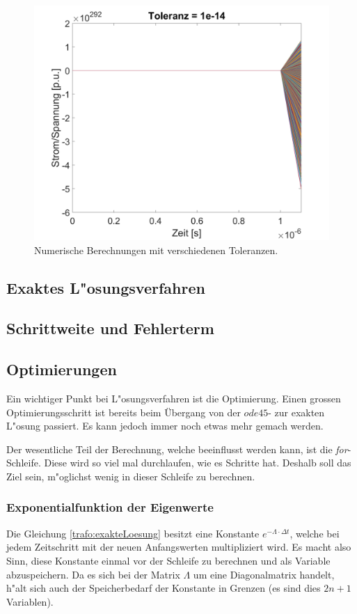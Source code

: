 \begin{refsection}
\begin{figure}
\begin{minipage}{.5\textwidth}
	    \end{minipage}%
	    \begin{minipage}{.5\textwidth}
	        \centering
	        \includegraphics[width=0.7\linewidth]{./trafo/images/svd14.png}
	    \end{minipage}
	    \caption{Numerische Berechnungen mit verschiedenen Toleranzen. }
	    \label{trafo:SVDTol}
	\end{figure}

\subsection{Exaktes L"osungsverfahren}

\subsection{Schrittweite und Fehlerterm}

\subsection{Optimierungen}

Ein wichtiger Punkt bei L"osungsverfahren ist die Optimierung. Einen grossen Optimierungsschritt ist bereits beim Übergang von der $ode45$- zur exakten L"osung passiert. Es kann jedoch immer noch etwas mehr gemach werden. 

Der wesentliche Teil der Berechnung, welche beeinflusst werden kann, ist die \textit{for}-Schleife. Diese wird so viel mal durchlaufen, wie es Schritte hat. Deshalb soll das Ziel sein, m"oglichst wenig in dieser Schleife zu berechnen. 

\subsubsection{Exponentialfunktion der Eigenwerte}
Die Gleichung \ref{trafo:exakteLoesung} besitzt eine Konstante $e^{-\Lambda \cdot \Delta t}$, welche bei jedem Zeitschritt mit der neuen Anfangswerten multipliziert wird. Es macht also Sinn, diese Konstante einmal vor der Schleife zu berechnen und als Variable abzuspeichern. Da es sich bei der Matrix $\Lambda$ um eine Diagonalmatrix handelt, h"alt sich auch der Speicherbedarf der Konstante in Grenzen (es sind dies $2n + 1$ Variablen). 


\end{refsection}
